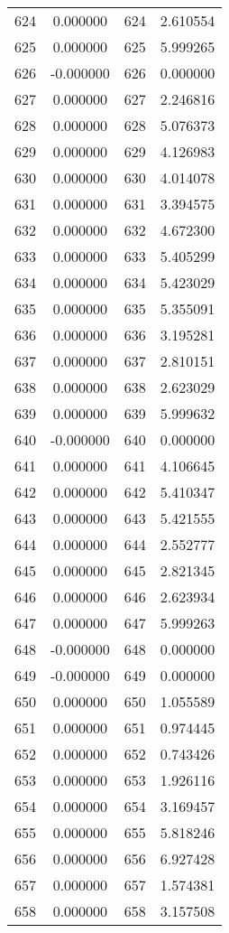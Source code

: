 \documentclass[12pt]{article}
\begin{document}
\begin{longtable}{@{}cccc@{}}
624 & 0.000000 & 624 & 2.610554 \\
625 & 0.000000 & 625 & 5.999265 \\
626 & -0.000000 & 626 & 0.000000 \\
627 & 0.000000 & 627 & 2.246816 \\
628 & 0.000000 & 628 & 5.076373 \\
629 & 0.000000 & 629 & 4.126983 \\
630 & 0.000000 & 630 & 4.014078 \\
631 & 0.000000 & 631 & 3.394575 \\
632 & 0.000000 & 632 & 4.672300 \\
633 & 0.000000 & 633 & 5.405299 \\
634 & 0.000000 & 634 & 5.423029 \\
635 & 0.000000 & 635 & 5.355091 \\
636 & 0.000000 & 636 & 3.195281 \\
637 & 0.000000 & 637 & 2.810151 \\
638 & 0.000000 & 638 & 2.623029 \\
639 & 0.000000 & 639 & 5.999632 \\
640 & -0.000000 & 640 & 0.000000 \\
641 & 0.000000 & 641 & 4.106645 \\
642 & 0.000000 & 642 & 5.410347 \\
643 & 0.000000 & 643 & 5.421555 \\
644 & 0.000000 & 644 & 2.552777 \\
645 & 0.000000 & 645 & 2.821345 \\
646 & 0.000000 & 646 & 2.623934 \\
647 & 0.000000 & 647 & 5.999263 \\
648 & -0.000000 & 648 & 0.000000 \\
649 & -0.000000 & 649 & 0.000000 \\
650 & 0.000000 & 650 & 1.055589 \\
651 & 0.000000 & 651 & 0.974445 \\
652 & 0.000000 & 652 & 0.743426 \\
653 & 0.000000 & 653 & 1.926116 \\
654 & 0.000000 & 654 & 3.169457 \\
655 & 0.000000 & 655 & 5.818246 \\
656 & 0.000000 & 656 & 6.927428 \\
657 & 0.000000 & 657 & 1.574381 \\
658 & 0.000000 & 658 & 3.157508 \\

\end{longtable}
\end{document}
